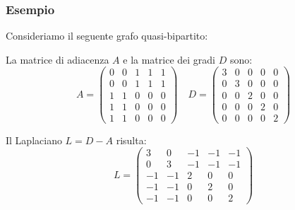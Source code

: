 	\subsubsection{Esempio}
	Consideriamo il seguente grafo quasi-bipartito:
    \begin{figure}[h!]
    \centering
\end{figure}

La matrice di adiacenza $A$ e la matrice dei gradi $D$ sono:
	$$ A = \begin{pmatrix}
		0 & 0 & 1 & 1 & 1 \\
		0 & 0 & 1 & 1 & 1 \\
		1 & 1 & 0 & 0 & 0 \\
		1 & 1 & 0 & 0 & 0 \\
		1 & 1 & 0 & 0 & 0 
	\end{pmatrix} \quad
	D = \begin{pmatrix}
		3 & 0 & 0 & 0 & 0 \\
		0 & 3 & 0 & 0 & 0 \\
		0 & 0 & 2 & 0 & 0 \\
		0 & 0 & 0 & 2 & 0 \\
		0 & 0 & 0 & 0 & 2 
	\end{pmatrix} $$
	
	Il Laplaciano $L = D - A$ risulta:
	$$ L = \begin{pmatrix}
		3 &  0 & -1 & -1 & -1 \\
		0 &  3 & -1 & -1 & -1 \\
		-1 & -1 &  2 &  0 &  0 \\
		-1 & -1 &  0 &  2 &  0 \\
		-1 & -1 &  0 &  0 &  2 
	\end{pmatrix} $$
	
